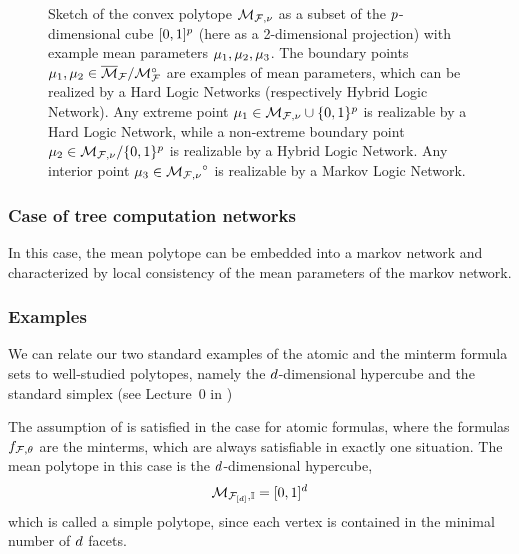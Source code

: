\begin{figure}[h]\label{fig:meansetSketch}
\begin{center}
	
\end{center}
\caption{Sketch of the convex polytope ${\mathcal{M}_{\mathcal{F},\nu}}$ as a subset of the $p$-dimensional cube $[0,1]^p$ (here as a 2-dimensional projection) with example mean 	parameters $\mu_1,\mu_2,\mu_3$.
	The boundary points $\mu_1,\mu_2\in\overline{\mathcal{M}}_{\mathcal{F}}/{\mathcal{M}}^{\circ}_{\mathcal{F}}$ are examples of mean parameters, which can be realized by a Hard Logic Networks (respectively Hybrid Logic Network). 
	Any extreme point $\mu_1\in\mathcal{M}_{\mathcal{F},\nu}\cup\{0,1\}^{p}$ is realizable by a Hard Logic Network, while a non-extreme boundary point $\mu_2\in\mathcal{M}_{\mathcal{F},\nu}/\{0,1\}^{p}$ is realizable by a Hybrid Logic Network.
	Any interior point $\mu_3\in{\mathcal{M}_{\mathcal{F},\nu}}^{\circ}$ is realizable by a Markov Logic Network.
} 
\end{figure}


\subsubsection{Case of tree computation networks}

In this case, the mean polytope can be embedded into a markov network and characterized by local consistency of the mean parameters of the markov network.


\subsubsection{Examples}

We can relate our two standard examples of the atomic and the minterm formula sets to well-studied polytopes, namely the $d$-dimensional hypercube and the standard simplex (see Lecture~0 in \cite{ziegler_lectures_2013} )

\begin{example}
	The assumption of  is satisfied in the case for atomic formulas, where the formulas  $f_{\mathcal{F},\theta}$ are the minterms, which are always satisfiable in exactly one situation.
	The mean polytope in this case is the $d$-dimensional hypercube,
		\[ \mathcal{M}_{\mathcal{F}_{[d]},\mathbb{I}} = [0,1]^{d} \]
	which is called a simple polytope, since each vertex is contained in the minimal number of $d$ facets.
\end{example}


